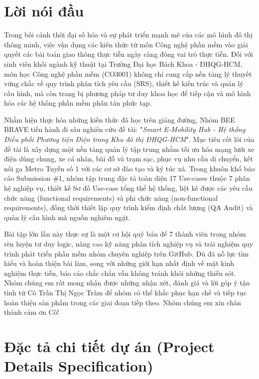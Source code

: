 \documentclass[12pt,a4paper]{report}
\begin{document}
\chapter*{Lời nói đầu}

Trong bối cảnh thời đại số hóa và sự phát triển mạnh mẽ của các mô hình đô thị thông minh, việc vận dụng các kiến thức từ môn Công nghệ phần mềm vào giải quyết các bài toán giao thông thực tiễn ngày càng đóng vai trò thực tiễn. 
Đối với sinh viên khối ngành kỹ thuật tại Trường Đại học Bách Khoa - ĐHQG-HCM, môn học Công nghệ phần mềm (CO3001) không chỉ cung cấp nền tảng lý thuyết vững chắc về quy trình phân tích yêu cầu (SRS), thiết kế kiến trúc 
và quản lý cấu hình, mà còn trang bị phương pháp tư duy khoa học để tiếp cận và mô hình hóa các hệ thống phần mềm phân tán phức tạp.


Nhằm hiện thực hóa những kiến thức đã học trên giảng đường, Nhóm BEE BRAVE tiến hành đi sâu nghiên cứu đề tài: "\textit{Smart E-Mobility Hub - Hệ thống Điều phối Phương tiện Điện trong Khu đô thị ĐHQG-HCM}". 
Mục tiêu cốt lõi của đề tài là xây dựng một nền tảng quản lý tập trung nhằm tối ưu hóa mạng lưới xe điện dùng chung, xe cá nhân, bãi đỗ và trạm sạc, phục vụ nhu cầu di chuyển, kết nối ga Metro Tuyến số 1 với các cơ sở đào tạo và ký túc xá. 
Trong khuôn khổ báo cáo Submission \#1, nhóm tập trung đặc tả toàn diện 17 Use-cases thuộc 7 phân hệ nghiệp vụ, thiết kế Sơ đồ Use-case tổng thể hệ thống, liệt kê được các yêu cầu chức năng (functional requirements) và phi chức năng (non-functional requirements), đồng thời thiết lập quy trình kiểm định chất lượng (QA Audit) và quản lý cấu hình mã nguồn nghiêm ngặt.


Bài tập lớn lần này thực sự là một cơ hội quý báu để 7 thành viên trong nhóm rèn luyện tư duy logic, nâng cao kỹ năng phân tích nghiệp vụ và trải nghiệm quy trình phát triển phần mềm nhóm chuyên nghiệp trên GitHub. Dù đã nỗ lực tìm hiểu và hoàn thiện bài làm, song với những giới 
hạn nhất định về mặt kinh nghiệm thực tiễn, báo cáo chắc chắn vẫn không tránh khỏi những thiếu sót. Nhóm chúng em rất mong nhận được những nhận xét, đánh giá và lời góp ý tận tình từ Cô Trần Thị Ngọc Trâm để nhóm có thể khắc phục hạn chế và tiếp tục hoàn thiện sản phẩm trong các giai đoạn tiếp theo. Nhóm chúng em xin chân thành cảm ơn Cô!

\chapter{Đặc tả chi tiết dự án (Project Details Specification)}
\end{document}
